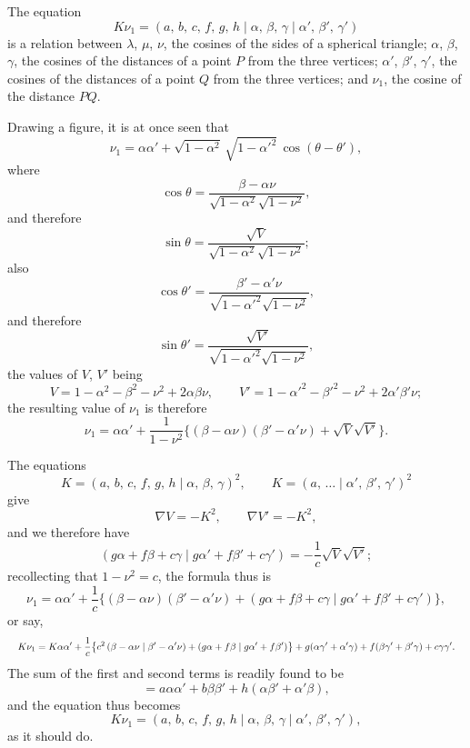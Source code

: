 \documentclass[11pt]{article}
\begin{document}
The equation
\[
   K\nu_1 = (a,\, b,\, c,\, f,\, g,\, h \mid \alpha,\, \beta,\, \gamma \mid \alpha',\, \beta',\, \gamma')
\]
is a relation between $\lambda$, $\mu$, $\nu$, the cosines of the sides of a spherical triangle; $\alpha$, $\beta$, $\gamma$, the
cosines of the distances of a point $P$ from the three vertices; $\alpha'$, $\beta'$, $\gamma'$, the cosines of
the distances of a point $Q$ from the three vertices; and $\nu_1$, the cosine of the distance
$PQ$.

Drawing a figure, it is at once seen that
\[
   \nu_1 = \alpha\alpha' + \sqrt{1 - \alpha^2}\,\sqrt{1 - \alpha'^2}\,\cos(\theta - \theta'),
\]
where
\[
   \cos\theta = \frac{\beta - \alpha\nu}{\sqrt{1 - \alpha^2}\sqrt{1 - \nu^2}},
\]
and therefore
\[
   \sin\theta = \frac{\sqrt{V}}{\sqrt{1 - \alpha^2}\sqrt{1 - \nu^2}};
\]
also
\[
   \cos\theta' = \frac{\beta' - \alpha'\nu}{\sqrt{1 - \alpha'^2}\sqrt{1 - \nu^2}},
\]
and therefore
\[
   \sin\theta' = \frac{\sqrt{V'}}{\sqrt{1 - \alpha'^2}\sqrt{1 - \nu^2}},
\]
the values of $V$, $V'$ being
\[
   V  = 1 - \alpha^2  - \beta^2  - \nu^2 + 2\alpha\beta\nu,\qquad
   V' = 1 - \alpha'^2 - \beta'^2 - \nu^2 + 2\alpha'\beta'\nu;
\]
the resulting value of $\nu_1$ is therefore
\[
   \nu_1 = \alpha\alpha' + \frac{1}{1 - \nu^2}\bigl\{(\beta - \alpha\nu)(\beta' - \alpha'\nu) + \sqrt{V}\sqrt{V'}\bigr\}.
\]

The equations
\[
   K = (a,\, b,\, c,\, f,\, g,\, h \mid \alpha,\, \beta,\, \gamma)^2,\qquad
   K = (a,\,\ldots \mid \alpha',\, \beta',\, \gamma')^2
\]
give
\[
   \nabla V = -K^2,\qquad \nabla V' = -K^2,
\]
and we therefore have
\[
   (g\alpha + f\beta + c\gamma \mid g\alpha' + f\beta' + c\gamma') = -\frac{1}{c}\sqrt{V}\sqrt{V'};
\]
recollecting that $1 - \nu^2 = c$, the formula thus is
\[
   \nu_1 = \alpha\alpha' + \frac{1}{c}\bigl\{(\beta - \alpha\nu)(\beta' - \alpha'\nu) + (g\alpha + f\beta + c\gamma \mid g\alpha' + f\beta' + c\gamma')\bigr\},
\]
or say,
\[
   \resizebox{\textwidth}{!}{$\displaystyle
   K\nu_1 = K\alpha\alpha' + \frac{1}{c}\bigl\{c^2\,(\beta - \alpha\nu \mid \beta' - \alpha'\nu) + (g\alpha + f\beta \mid g\alpha' + f\beta')\bigr\}
            + g(\alpha\gamma' + \alpha'\gamma) + f(\beta\gamma' + \beta'\gamma) + c\gamma\gamma'.$}
\]
The sum of the first and second terms is readily found to be
\[
   = a\alpha\alpha' + b\beta\beta' + h(\alpha\beta' + \alpha'\beta),
\]
and the equation thus becomes
\[
   K\nu_1 = (a,\, b,\, c,\, f,\, g,\, h \mid \alpha,\, \beta,\, \gamma \mid \alpha',\, \beta',\, \gamma'),
\]
as it should do.

\bigskip
\end{document}
